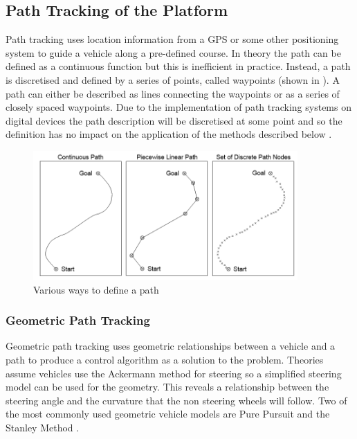 \documentclass[main.tex]{subfiles}
\begin{document}
\subsection{Path Tracking of the Platform}
Path tracking uses location information from a GPS or some other positioning system to guide a vehicle along a pre-defined course. In theory the path can be defined as a continuous function but this is inefficient in practice. Instead, a path is discretised and defined by a series of points, called waypoints (shown in ). A path can either be described as lines connecting the waypoints or as a series of closely spaced waypoints. Due to the implementation of path tracking systems on digital devices the path description will be discretised at some point and so the definition has no impact on the application of the methods described below \parencite{Giesbrecht2005}.
\begin{figure}[ht]
\includegraphics[width=0.9\textwidth]{3-LiteratureReview/pathDefining.png}
\centering
\caption[Various ways to define a path]{Various ways to define a path \parencite{Giesbrecht2005}} 
\end{figure}

\subsubsection{Geometric Path Tracking}
Geometric path tracking uses geometric relationships between a vehicle and a path to produce a control algorithm as a solution to the problem. Theories assume vehicles use the Ackermann method for steering so a simplified steering model can be used for the geometry. This reveals a relationship between the steering angle and the curvature that the non steering wheels will follow. Two of the most commonly used geometric vehicle models are Pure Pursuit and the Stanley Method \parencite{snider2009}.
\end{document}
